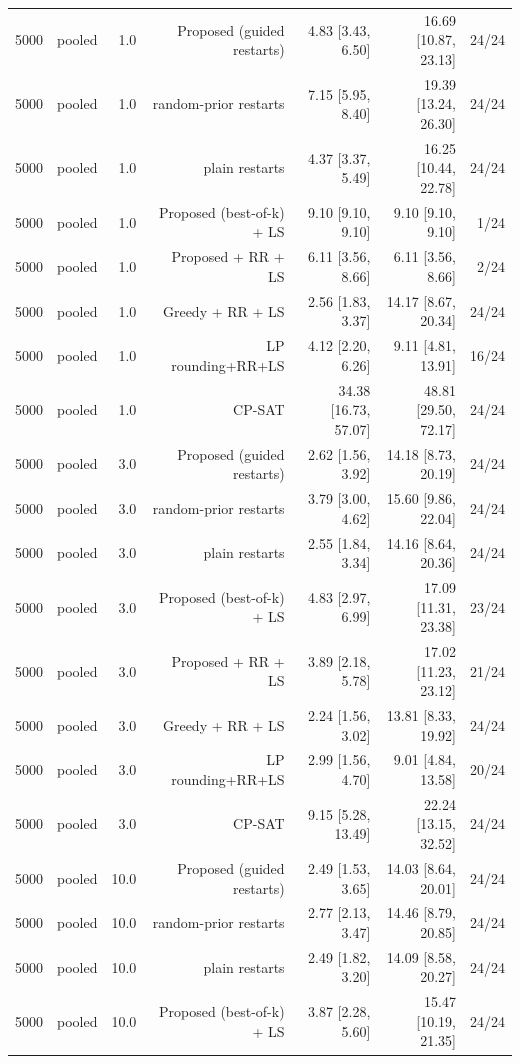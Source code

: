 \begin{table}[t]
\begin{tabular}{llrrrrr}
5000 & pooled & 1.0 & Proposed (guided restarts) & 4.83 [3.43, 6.50] & 16.69 [10.87, 23.13] & 24/24 \\
5000 & pooled & 1.0 & random-prior restarts & 7.15 [5.95, 8.40] & 19.39 [13.24, 26.30] & 24/24 \\
5000 & pooled & 1.0 & plain restarts & 4.37 [3.37, 5.49] & 16.25 [10.44, 22.78] & 24/24 \\
5000 & pooled & 1.0 & Proposed (best-of-k) + LS & 9.10 [9.10, 9.10] & 9.10 [9.10, 9.10] & 1/24 \\
5000 & pooled & 1.0 & Proposed + RR + LS & 6.11 [3.56, 8.66] & 6.11 [3.56, 8.66] & 2/24 \\
5000 & pooled & 1.0 & Greedy + RR + LS & 2.56 [1.83, 3.37] & 14.17 [8.67, 20.34] & 24/24 \\
5000 & pooled & 1.0 & LP rounding+RR+LS & 4.12 [2.20, 6.26] & 9.11 [4.81, 13.91] & 16/24 \\
5000 & pooled & 1.0 & CP-SAT & 34.38 [16.73, 57.07] & 48.81 [29.50, 72.17] & 24/24 \\
5000 & pooled & 3.0 & Proposed (guided restarts) & 2.62 [1.56, 3.92] & 14.18 [8.73, 20.19] & 24/24 \\
5000 & pooled & 3.0 & random-prior restarts & 3.79 [3.00, 4.62] & 15.60 [9.86, 22.04] & 24/24 \\
5000 & pooled & 3.0 & plain restarts & 2.55 [1.84, 3.34] & 14.16 [8.64, 20.36] & 24/24 \\
5000 & pooled & 3.0 & Proposed (best-of-k) + LS & 4.83 [2.97, 6.99] & 17.09 [11.31, 23.38] & 23/24 \\
5000 & pooled & 3.0 & Proposed + RR + LS & 3.89 [2.18, 5.78] & 17.02 [11.23, 23.12] & 21/24 \\
5000 & pooled & 3.0 & Greedy + RR + LS & 2.24 [1.56, 3.02] & 13.81 [8.33, 19.92] & 24/24 \\
5000 & pooled & 3.0 & LP rounding+RR+LS & 2.99 [1.56, 4.70] & 9.01 [4.84, 13.58] & 20/24 \\
5000 & pooled & 3.0 & CP-SAT & 9.15 [5.28, 13.49] & 22.24 [13.15, 32.52] & 24/24 \\
5000 & pooled & 10.0 & Proposed (guided restarts) & 2.49 [1.53, 3.65] & 14.03 [8.64, 20.01] & 24/24 \\
5000 & pooled & 10.0 & random-prior restarts & 2.77 [2.13, 3.47] & 14.46 [8.79, 20.85] & 24/24 \\
5000 & pooled & 10.0 & plain restarts & 2.49 [1.82, 3.20] & 14.09 [8.58, 20.27] & 24/24 \\
5000 & pooled & 10.0 & Proposed (best-of-k) + LS & 3.87 [2.28, 5.60] & 15.47 [10.19, 21.35] & 24/24 \\

\end{tabular}
\end{table}
